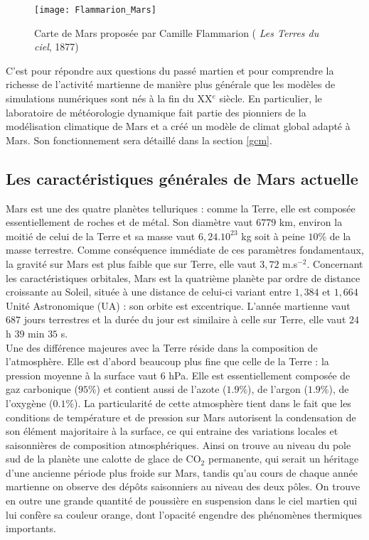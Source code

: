 \documentclass[11pt,a4paper]{article}
\begin{document}
\begin{figure}[h!]
\begin{center}
\texttt{[image: Flammarion\_Mars]}
\caption{Carte de Mars proposée par Camille Flammarion ( \emph{Les Terres du ciel}, 1877)}
\label{flammarion}
\end{center}
\end{figure}



C'est pour répondre aux questions du passé martien et pour comprendre la richesse de l'activité martienne de manière plus générale que les modèles de simulations numériques sont nés à la fin du XX$^e$ siècle. En particulier, le laboratoire de météorologie dynamique fait partie des pionniers de la modélisation climatique de Mars et a créé un modèle de climat global adapté à Mars. Son fonctionnement sera détaillé dans la section \ref{gcm}. \\

\subsection{Les caractéristiques générales de Mars actuelle}
Mars est une des quatre planètes telluriques : comme la Terre, elle est composée essentiellement de roches et de métal. Son diamètre vaut $6779$ km, environ la moitié de celui de la Terre et sa masse vaut $6,24.10^{23}$ kg soit à peine $10\%$ de la masse terrestre. Comme conséquence immédiate de ces paramètres fondamentaux, la gravité sur Mars est plus faible que sur Terre, elle vaut $3,72$ m.s$^{-2}$. Concernant les caractéristiques orbitales, Mars est la quatrième planète par ordre de distance croissante au Soleil, située à une distance de celui-ci variant entre $1,384$ et $1,664$ Unité Astronomique (UA) : son orbite est excentrique. L'année martienne vaut $687$ jours terrestres et la durée du jour est similaire à celle sur Terre, elle vaut $24$ h $39$ min $35$ s.  \\

Une des différence majeures avec la Terre réside dans la composition de l'atmosphère. Elle est d'abord beaucoup plus fine que celle de la Terre : la pression moyenne à la surface vaut $6$ hPa. Elle est essentiellement composée de gaz carbonique ($95\%$) et contient aussi de l'azote ($1.9\%$), de l'argon ($1.9\%$), de l'oxygène ($0.1\%$). La particularité de cette atmosphère tient dans le fait que les conditions de température et de pression sur Mars autorisent la condensation de son élément majoritaire à la surface, ce qui entraine des variations locales et saisonnières de composition atmosphériques. Ainsi on trouve au niveau du pole sud de la planète une calotte de glace de CO$_2$ permanente, qui serait un héritage d'une ancienne période plus froide sur Mars, tandis qu'au cours de chaque année martienne on observe des dépôts saisonniers au niveau des deux pôles. On trouve en outre une grande quantité de poussière en suspension dans le ciel martien qui lui confère sa couleur orange, dont l'opacité engendre des phénomènes thermiques importants. \\
\end{document}
